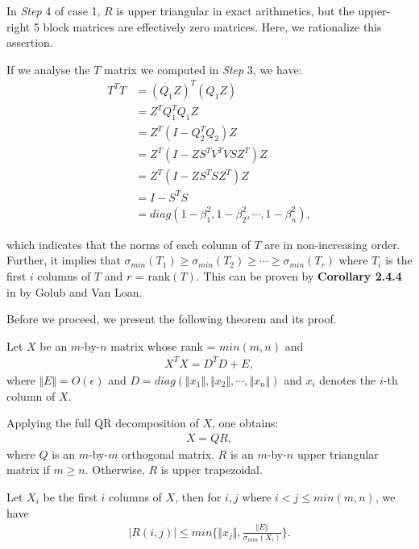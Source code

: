 \begin{remark}
{\rm 
In \textit{Step} 4 of case 1, $R$ is upper triangular in exact arithmetics, but the upper-right 5 block matrices are effectively zero matrices. Here, we rationalize this assertion. 

If we analyse the $T$ matrix we computed in \textit{Step} 3, we have:
\begin{align*}
T^{T}T &= (Q_{1}Z)^{T}(Q_{1}Z) \\
	   &= Z^{T}Q_{1}^{T}Q_{1}Z \\
	   &= Z^{T}(I - Q_{2}^{T}Q_{2})Z \\
	   &= Z^{T}(I - ZS^{T}V^{T}VSZ^{T})Z \\
	   &= Z^{T}(I - ZS^{T}SZ^{T})Z \\
	   &= I - S^{T}S \\
	   &= diag(1-\beta_{1}^{2}, 1-\beta_{2}^{2}, \cdots, 1-\beta_{n}^{2}),
\end{align*}

which indicates that the norms of each column of $T$ are in non-increasing order. Further, it implies that $\sigma_{min}(T_{1}) \geq \sigma_{min}(T_{2}) \geq \cdots \geq \sigma_{min}(T_{r})$ where $T_{i}$ is the first $i$ columns of $T$ and $r$ = rank$(T)$. This can be proven by \textbf{Corollary 2.4.4} in \cite[pp.~78--78]{golub2013matrix} by Golub and Van Loan.

Before we proceed, we present the following theorem and its proof.

\begin{theorem}
Let $X$ be an $m$-by-$n$ matrix whose rank = $min(m, n)$ and
\begin{align*}
	X^{T}X = D^{T}D + E,
\end{align*}
where $\Vert E \Vert = O(\epsilon)$ and $D = diag(\Vert x_{1} \Vert, \Vert x_{2} \Vert, \cdots, \Vert x_{n} \Vert)$ and $x_{i}$ denotes the $i$-th column of $X$.

Applying the full QR decomposition of $X$, one obtains:
\begin{align}
	X = QR,
\end{align}
where $Q$ is an $m$-by-$m$ orthogonal matrix. $R$ is an $m$-by-$n$ upper triangular matrix if $m \geq n$. Otherwise, $R$ is upper trapezoidal. 

Let $X_{i}$ be the first $i$ columns of $X$, then for $i, j$ where $i < j \leq min(m, n)$, we have
\begin{align}
	\left|R(i, j)\right| \leq min\{\Vert x_{j} \Vert, \frac{\Vert E \Vert}{\sigma_{min}(X_{i})} \}.
\end{align}
\end{theorem}

}
\end{remark}
